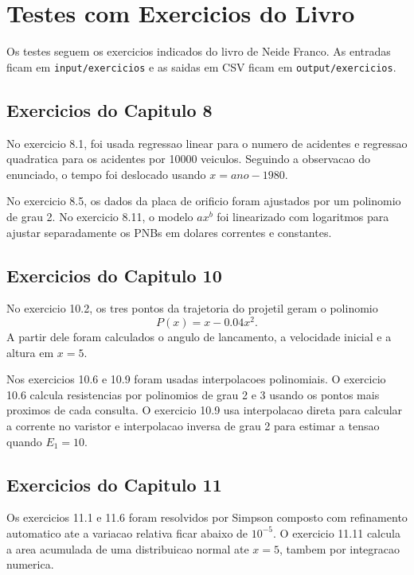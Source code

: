 \documentclass[../main.tex]{subfiles}
\begin{document}
\section{Testes com Exercicios do Livro}

Os testes seguem os exercicios indicados do livro de Neide Franco. As entradas
ficam em \texttt{input/exercicios} e as saidas em CSV ficam em
\texttt{output/exercicios}.

\subsection{Exercicios do Capitulo 8}

No exercicio 8.1, foi usada regressao linear para o numero de acidentes e
regressao quadratica para os acidentes por 10000 veiculos. Seguindo a
observacao do enunciado, o tempo foi deslocado usando \(x = ano - 1980\).

No exercicio 8.5, os dados da placa de orificio foram ajustados por um
polinomio de grau 2. No exercicio 8.11, o modelo \(a x^b\) foi linearizado com
logaritmos para ajustar separadamente os PNBs em dolares correntes e constantes.

\subsection{Exercicios do Capitulo 10}

No exercicio 10.2, os tres pontos da trajetoria do projetil geram o polinomio
\[
    P(x) = x - 0.04x^2.
\]
A partir dele foram calculados o angulo de lancamento, a velocidade inicial e a
altura em \(x=5\).

Nos exercicios 10.6 e 10.9 foram usadas interpolacoes polinomiais. O exercicio
10.6 calcula resistencias por polinomios de grau 2 e 3 usando os pontos mais
proximos de cada consulta. O exercicio 10.9 usa interpolacao direta para
calcular a corrente no varistor e interpolacao inversa de grau 2 para estimar a
tensao quando \(E_1=10\).

\subsection{Exercicios do Capitulo 11}

Os exercicios 11.1 e 11.6 foram resolvidos por Simpson composto com refinamento
automatico ate a variacao relativa ficar abaixo de \(10^{-5}\). O exercicio
11.11 calcula a area acumulada de uma distribuicao normal ate \(x=5\), tambem
por integracao numerica.
\end{document}
